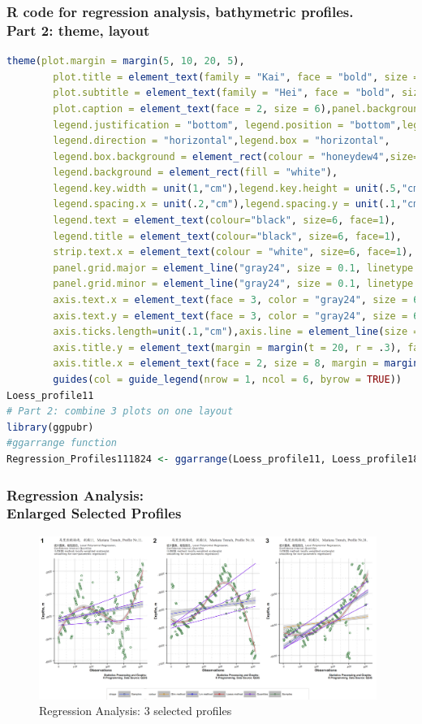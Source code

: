 \documentclass[pdflatex,compress,10pt,
	xcolor={dvipsnames,dvipsnames,svgnames,x11names,table},
	hyperref={colorlinks = true,breaklinks = true, urlcolor = NavyBlue, breaklinks = true}]{beamer}
\begin{document}
\begin{frame}[fragile,shrink=10]\frametitle{R code for regression analysis, bathymetric profiles.\\ Part 2: theme, layout}
\begin{lstlisting}[language=R]
	theme(plot.margin = margin(5, 10, 20, 5),
		plot.title = element_text(family = "Kai", face = "bold", size = 8),
		plot.subtitle = element_text(family = "Hei", face = "bold", size = 6),
		plot.caption = element_text(face = 2, size = 6),panel.background=ggplot2::element_rect(fill = "white")
		legend.justification = "bottom", legend.position = "bottom",legend.box.just = "right",
		legend.direction = "horizontal",legend.box = "horizontal",
		legend.box.background = element_rect(colour = "honeydew4",size=0.2),
		legend.background = element_rect(fill = "white"),
		legend.key.width = unit(1,"cm"),legend.key.height = unit(.5,"cm"),
		legend.spacing.x = unit(.2,"cm"),legend.spacing.y = unit(.1,"cm"),
		legend.text = element_text(colour="black", size=6, face=1),
		legend.title = element_text(colour="black", size=6, face=1),
		strip.text.x = element_text(colour = "white", size=6, face=1),
		panel.grid.major = element_line("gray24", size = 0.1, linetype = "solid"),
		panel.grid.minor = element_line("gray24", size = 0.1, linetype = "dotted"),
		axis.text.x = element_text(face = 3, color = "gray24", size = 6, angle = 15),
		axis.text.y = element_text(face = 3, color = "gray24", size = 6, angle = 15),
		axis.ticks.length=unit(.1,"cm"),axis.line = element_line(size = .3, colour = "grey80"),
		axis.title.y = element_text(margin = margin(t = 20, r = .3), face = 2, size = 8),
		axis.title.x = element_text(face = 2, size = 8, margin = margin(t = .2))) +
		guides(col = guide_legend(nrow = 1, ncol = 6, byrow = TRUE)) 
Loess_profile11
# Part 2: combine 3 plots on one layout
library(ggpubr)
#ggarrange function
Regression_Profiles111824 <- ggarrange(Loess_profile11, Loess_profile18, Loess_profile24, labels = c("1", "2", "3"), ncol = 3, nrow = 1, common.legend = TRUE, legend = "bottom")
\end{lstlisting}
\end{frame}
	
\begin{frame}\frametitle{Regression Analysis:\\Enlarged Selected Profiles}
\begin{figure}[H]
	\centering
		\includegraphics[width=11cm]{Fig-2-8b.jpg}
	\caption{Regression Analysis: 3 selected profiles}
\end{figure}		
\end{frame}
\end{document}
